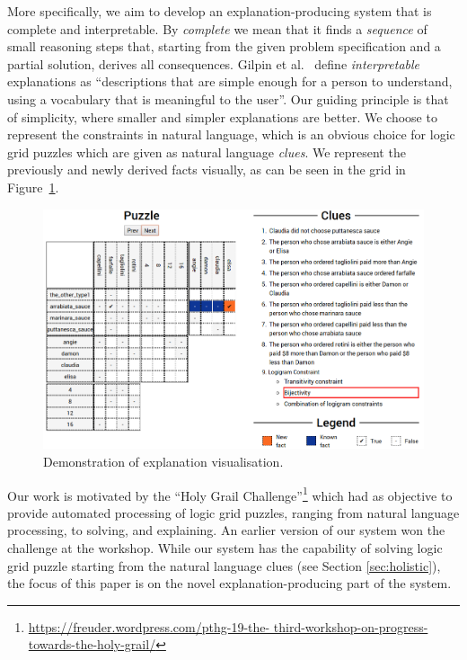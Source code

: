 More specifically, we aim to develop an explanation-producing system that is complete and interpretable. 
By \textit{complete} we mean that it finds a \textit{sequence} of small reasoning steps that, starting from the given problem specification and a partial solution, derives all consequences. 
Gilpin et al.~\cite{DBLP:conf/dsaa/GilpinBYBSK18} define \textit{interpretable} explanations as ``descriptions that are simple enough for a person to understand, using a vocabulary that is meaningful to the user''. 
Our guiding principle is that of simplicity, where smaller and simpler explanations are better.
We choose to represent the constraints in natural language, which is an obvious choice for logic grid puzzles which are given as natural language \textit{clues}. 
We represent the previously and newly derived facts visually, as can be seen in the grid in Figure~\ref{fig:zebrascreen}.

\begin{figure}[ht]
\centering
\includegraphics[width=\linewidth]{figures/zebra_screen}
\caption{Demonstration of explanation visualisation.}
\label{fig:zebrascreen}
\end{figure}

Our work is motivated by the ``Holy Grail Challenge''\footnote{\tiny \url{https://freuder.wordpress.com/pthg-19-the- third-workshop-on-progress-towards-the-holy-grail/}} which had as objective to provide automated processing of logic grid puzzles, ranging from natural language processing, to solving, and explaining. 
An earlier version of our system won the challenge at the workshop. 
While our system has the capability of solving logic grid puzzle starting from the natural language clues (see Section \ref{sec:holistic}), the focus of this paper is on the novel explanation-producing part of the system.

